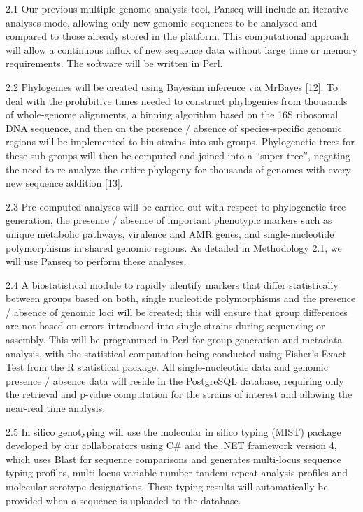 \documentclass[letterpaper,12pt]{report}
\begin{document}
2.1 Our previous multiple-genome analysis tool, Panseq will include an iterative analyses mode, allowing only new genomic sequences to be analyzed and compared to those already stored in the platform. This computational approach will allow a continuous influx of new sequence data without large time or memory requirements. The software will be written in Perl.
 
2.2 Phylogenies will be created using Bayesian inference via MrBayes [12]. To deal with the prohibitive times needed to construct phylogenies from thousands of whole-genome alignments, a binning algorithm based on the 16S ribosomal DNA sequence, and then on the presence / absence of species-specific genomic regions will be implemented to bin strains into sub-groups. Phylogenetic trees for these sub-groups will then be computed and joined into a “super tree”, negating the need to re-analyze the entire phylogeny for thousands of genomes with every new sequence addition [13].


2.3 Pre-computed analyses will be carried out with respect to phylogenetic tree generation, the presence / absence of important phenotypic markers such as unique metabolic pathways, virulence and AMR genes, and single-nucleotide polymorphisms in shared genomic regions. As detailed in Methodology 2.1, we will use Panseq to perform these analyses.


2.4 A biostatistical module to rapidly identify markers that differ statistically between groups based on both, single nucleotide polymorphisms and the presence / absence of genomic loci will be created; this will ensure that group differences are not based on errors introduced into single strains during sequencing or assembly. This will be programmed in Perl for group generation and metadata analysis, with the statistical computation being conducted using Fisher’s Exact Test from the R statistical package.  All single-nucleotide data and genomic presence / absence data will reside in the PostgreSQL database, requiring only the retrieval and p-value computation for the strains of interest and allowing the near-real time analysis.

 
2.5 In silico genotyping will use the molecular in silico typing (MIST) package developed by our collaborators using C\# and the .NET framework version 4, which uses Blast for sequence comparisons and generates multi-locus sequence typing profiles, multi-locus variable number tandem repeat analysis profiles and molecular serotype designations. These typing results will automatically be provided when a sequence is uploaded to the database.
\end{document}
